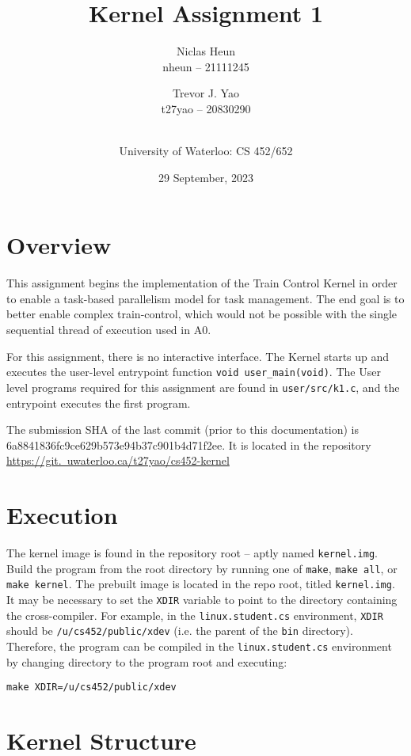 \documentclass[12pt]{article}
\title{Kernel Assignment 1}
\author{Niclas Heun \\ nheun -- 21111245 \and Trevor J. Yao \\ t27yao -- 20830290 \and \\ University of Waterloo: CS 452/652}
\date{29 September, 2023}
\begin{document}
    \maketitle
    \pagestyle{fancy}

    \section{Overview}
    \label{sec:overview}

    This assignment begins the implementation of the Train Control Kernel in order to enable a task-based parallelism model for task management. The end goal is to better enable complex train-control, which would not be possible with the single sequential thread of execution used in A0.

    For this assignment, there is no interactive interface. The Kernel starts up and executes the user-level entrypoint function \verb`void user_main(void)`. The User level programs required for this assignment are found in \verb`user/src/k1.c`, and the entrypoint executes the first program.

    The submission SHA of the last commit (prior to this documentation) is  \\ 6a8841836fc9ce629b573e94b37c901b4d71f2ee. It is located in the repository \href{https://git.uwaterloo.ca/t27yao/cs452-kernel}{https://git.\ uwaterloo.ca/t27yao/cs452-kernel}

    \section{Execution}

    The kernel image is found in the repository root -- aptly named \verb`kernel.img`. Build the program from the root directory by running one of \verb`make`, \verb`make all`, or \verb`make kernel`. The prebuilt image is located in the repo root, titled \verb`kernel.img`. It may be necessary to set the \verb`XDIR` variable to point to the directory containing the cross-compiler. For example, in the \verb`linux.student.cs` environment, \verb`XDIR` should be \verb`/u/cs452/public/xdev` (i.e. the parent of the \verb`bin` directory). Therefore, the program can be compiled in the \verb`linux.student.cs` environment by changing directory to the program root and executing:
    \begin{verbatim}
make XDIR=/u/cs452/public/xdev
    \end{verbatim}

    \section{Kernel Structure}
\end{document}
